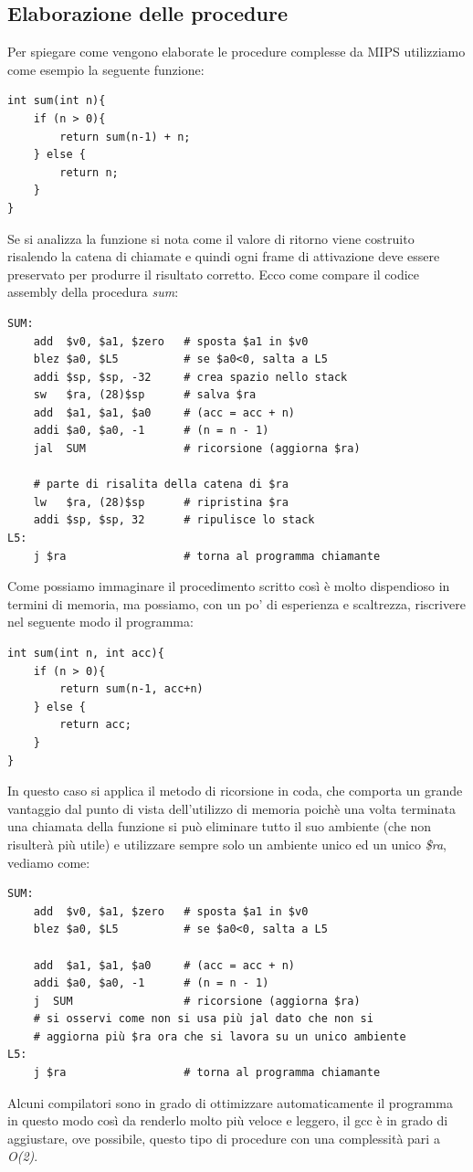 \documentclass[class=book, crop=false]{standalone}
\begin{document}
\subsection{Elaborazione delle procedure}
Per spiegare come vengono elaborate le procedure complesse da MIPS utilizziamo come esempio la seguente funzione:

\begin{verbatim}
int sum(int n){
	if (n > 0){
		return sum(n-1) + n;
	} else {
		return n;
	}
}
\end{verbatim}

Se si analizza la funzione si nota come il valore di ritorno viene costruito risalendo la catena di chiamate e quindi ogni frame di attivazione deve essere preservato per produrre il risultato corretto. Ecco come compare il codice assembly della procedura \emph{sum}:

\begin{verbatim}
SUM:
	add  $v0, $a1, $zero   # sposta $a1 in $v0
	blez $a0, $L5          # se $a0<0, salta a L5
	addi $sp, $sp, -32     # crea spazio nello stack
	sw   $ra, (28)$sp      # salva $ra
	add  $a1, $a1, $a0     # (acc = acc + n)
	addi $a0, $a0, -1      # (n = n - 1)
	jal  SUM               # ricorsione (aggiorna $ra)

	# parte di risalita della catena di $ra
	lw   $ra, (28)$sp      # ripristina $ra
	addi $sp, $sp, 32      # ripulisce lo stack
L5:
	j $ra                  # torna al programma chiamante
\end{verbatim}

Come possiamo immaginare il procedimento scritto così è  molto dispendioso in termini di memoria, ma possiamo, con un po' di esperienza e scaltrezza, riscrivere nel seguente modo il programma:

\begin{verbatim}
int sum(int n, int acc){
	if (n > 0){
		return sum(n-1, acc+n)
	} else {
		return acc;
	}
}
\end{verbatim}

In questo caso si applica il metodo di ricorsione in coda, che comporta un grande vantaggio dal punto di vista dell'utilizzo di memoria poichè una volta terminata una chiamata della funzione si può eliminare tutto il suo ambiente (che non risulterà più utile) e utilizzare sempre solo un ambiente unico ed un unico \emph{\$ra}, vediamo come:

\begin{verbatim}
SUM:
	add  $v0, $a1, $zero   # sposta $a1 in $v0
	blez $a0, $L5          # se $a0<0, salta a L5

	add  $a1, $a1, $a0     # (acc = acc + n)
	addi $a0, $a0, -1      # (n = n - 1)
	j  SUM                 # ricorsione (aggiorna $ra)
	# si osservi come non si usa più jal dato che non si
	# aggiorna più $ra ora che si lavora su un unico ambiente
L5:
	j $ra                  # torna al programma chiamante
\end{verbatim}
Alcuni compilatori sono in grado di ottimizzare automaticamente il programma in questo modo così da renderlo molto più veloce e leggero, il gcc è in grado di aggiustare, ove possibile, questo tipo di procedure con una complessità pari a \emph{O(2)}.
\end{document}
